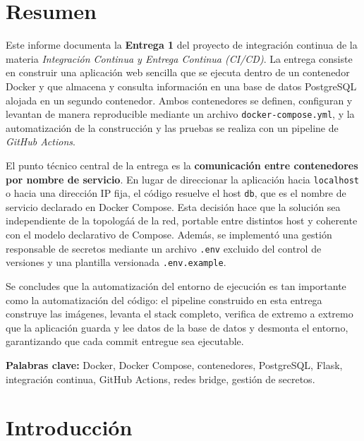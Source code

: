 \documentclass[12pt,a4paper]{article}
\begin{document}
\tableofcontents
\newpage
\listoffigures
\newpage

\section{Resumen}

Este informe documenta la \textbf{Entrega 1} del proyecto de integraci\'on continua de la
materia \textit{Integraci\'on Continua y Entrega Continua (CI/CD)}. La entrega consiste en
construir una aplicaci\'on web sencilla que se ejecuta dentro de un contenedor Docker y que
almacena y consulta informaci\'on en una base de datos PostgreSQL alojada en un segundo
contenedor. Ambos contenedores se definen, configuran y levantan de manera reproducible
mediante un archivo \texttt{docker-compose.yml}, y la automatizaci\'on de la construcci\'on
y las pruebas se realiza con un pipeline de \emph{GitHub Actions}.

El punto t\'ecnico central de la entrega es la \textbf{comunicaci\'on entre contenedores por
nombre de servicio}. En lugar de direccionar la aplicaci\'on hacia \texttt{localhost} o
hacia una direcci\'on IP fija, el c\'odigo resuelve el host \texttt{db}, que es el nombre
de servicio declarado en Docker Compose. Esta decisi\'on hace que la soluci\'on sea
independiente de la topolog\'a\'a de la red, portable entre distintos host y coherente con
el modelo declarativo de Compose. Adem\'as, se implement\'o una gesti\'on responsable de
secretos mediante un archivo \texttt{.env} excluido del control de versiones y una
plantilla versionada \texttt{.env.example}.

Se concludes que la automatizaci\'on del entorno de ejecuci\'on es tan importante como la
automatizaci\'on del c\'odigo: el pipeline construido en esta entrega construye las
imágenes, levanta el stack completo, verifica de extremo a extremo que la aplicaci\'on
guarda y lee datos de la base de datos y desmonta el entorno, garantizando que cada
commit entregue sea ejecutable.

\textbf{Palabras clave:} Docker, Docker Compose, contenedores, PostgreSQL, Flask,
integraci\'on continua, GitHub Actions, redes bridge, gesti\'on de secretos.

\section{Introducci\'on}
\end{document}
